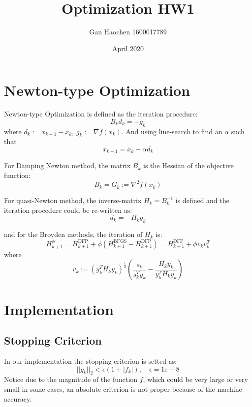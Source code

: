 \documentclass{article}
\title{Optimization HW1}
\author{Gan Haochen 1600017789 }
\date{April 2020}
\begin{document}
\maketitle

\section{Newton-type Optimization}

Newton-type Optimization is defined as the iteration procedure:
\begin{equation}
B_kd_{k} = -g_k
\end{equation}
where $d_k:=x_{k+1} - x_{k} $, $g_k:= \nabla f(x_k)$.
And using line-search to find an $\alpha$ such that 
\begin{equation}
x_{k+1} = x_{k} + \alpha  d_{k}
\end{equation}

For Damping Newton method, the matrix $B_k$ is the Hessian of the objective function:
\begin{equation}
B_k = G_k := \nabla^2f(x_k)
\end{equation}

For quasi-Newton method, the inverse-matrix $H_k = B_k^{-1}$ is defined and the iteration procedure could be re-written as:
\begin{equation}
d_{k} = -H_kg_k
\end{equation}

and for the Broyden methods, the iteration of $H_k$ is:
\begin{equation}
H_{k+1}^{\phi} = H_{k+1}^{\mathrm{DFP}} + \phi(H_{k+1}^{\mathrm{BFGS}} - H_{k+1}^{\mathrm{DFP}}) = H_{k+1}^{\mathrm{DFP}} + \phi v_k v_k^T
\end{equation}
where 
\begin{equation*}
v_k := (y_k^TH_ky_k)^{\frac{1}{2}} (\frac{s_k}{s_k^Ty_k} - \frac{H_ky_k}{y_k^TH_ky_k})
\end{equation*}

\section{Implementation}
\subsection{Stopping Criterion}
In our implementation the stopping criterion is setted as:
\begin{equation}
||g_k||_2 < \epsilon (1 + |f_k|),\quad \epsilon = 1\mathrm{e}-8
\end{equation}
Notice due to the magnitude of the function $f$, which could be very large or very small in some cases, an absolute criterion is not proper because of the machine accuracy.
\end{document}
